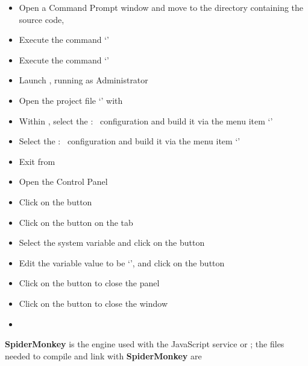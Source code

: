 \tertiaryEnd
{}
\begin{itemize}
\item Open a Command Prompt window and move to the directory containing the \mplusm{}
source code, 
\item\exSp{}Execute the command `'
\item\exSp{}Execute the command `'
\item\exSp{}Launch , running as Administrator
\item\exSp{}Open the project file
`' with
\item\exSp{}Within , select the  :\ 
configuration and build it via the menu item
`'
\item\exSp{}Select the  :\  configuration and build it via
the menu item `'
\item\exSp{}Exit from 
\item\exSp{}Open the  Control Panel
\item\exSp{}Click on the  button
\item\exSp{}Click on the  button on the 
tab
\item\exSp{}Select the  system variable and click on the 
button 
\item\exSp{}Edit the variable value to be `',
and click on the  button
\item\exSp{}Click on the  button to close the 
panel
\item\exSp{}Click on the  button to close the 
window
\end{itemize}
\tertiaryEnd
{}
\begin{itemize}
\item\TBD
\end{itemize}
\tertiaryEnd
\secondaryEnd
{}
\textbf{SpiderMonkey} is the  engine used with the JavaScript
service or \mplusm{}; the files needed to compile and link with \textbf{SpiderMonkey} are
